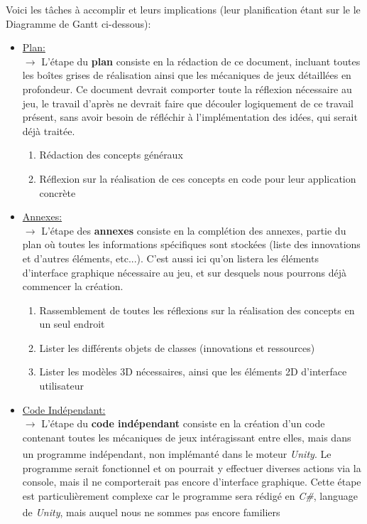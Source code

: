 \documentclass{article}
\def\reg{\small{\textsuperscript{\textregistered}}}
\begin{document}
    Voici les tâches à accomplir et leurs implications (leur planification étant sur le le Diagramme de Gantt ci-dessous):
        \begin{itemize}
            \item \underline{Plan:}\\
                $\rightarrow$ L'étape du \textbf{plan} consiste en la rédaction de ce document, incluant toutes les boîtes grises de réalisation ainsi que les mécaniques de jeux détaillées en profondeur. Ce document devrait comporter toute la réflexion nécessaire au jeu, le travail d'après ne devrait faire que découler logiquement de ce travail présent, sans avoir besoin de réfléchir à l'implémentation des idées, qui serait déjà traitée.
                \begin{enumerate}
                    \item Rédaction des concepts généraux
                    \item Réflexion sur la réalisation de ces concepts en code pour leur application concrète
                \end{enumerate}
            \item \underline{Annexes:}\\
                $\rightarrow$ L'étape des \textbf{annexes} consiste en la complétion des annexes, partie du plan où toutes les informations spécifiques sont stockées (liste des innovations et d'autres éléments, etc...). C'est aussi ici qu'on listera les éléments d'interface graphique nécessaire au jeu, et sur desquels nous pourrons déjà commencer la création.
               \begin{enumerate}
                   \item Rassemblement de toutes les réflexions sur la réalisation des concepts en un seul endroit
                   \item Lister les différents objets de classes (innovations et ressources)
                   \item Lister les modèles 3D nécessaires, ainsi que les éléments 2D d'interface utilisateur
               \end{enumerate} 
            \item \underline{Code Indépendant:}\\
                $\rightarrow$ L'étape du \textbf{code indépendant} consiste en la création d'un code contenant toutes les mécaniques de jeux intéragissant entre elles, mais dans un programme indépendant, non implémanté dans le moteur \textit{Unity\reg}. Le programme serait fonctionnel et on pourrait y effectuer diverses actions via la console, mais il ne comporterait pas encore d'interface graphique. Cette étape est particulièrement complexe car le programme sera rédigé en \textit{C#}, language de \textit{Unity\reg}, mais auquel nous ne sommes pas encore familiers

\end{itemize}
\end{document}
